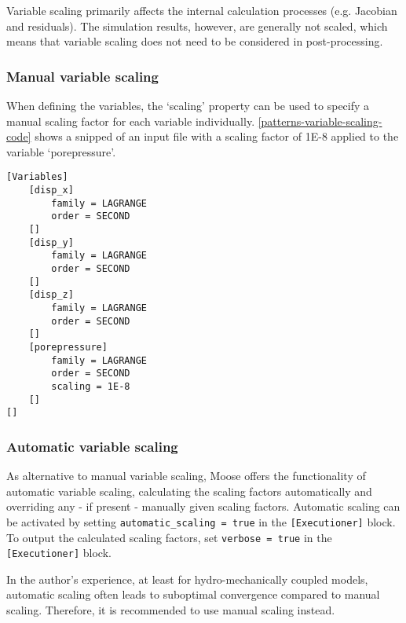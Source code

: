 Variable scaling primarily affects the internal calculation processes (e.g.
Jacobian and residuals). The simulation results, however, are generally not
scaled, which means that variable scaling does not need to be considered in
post-processing.

\subsubsection{Manual variable scaling}

When defining the variables, the ‘scaling’ property can be used to specify a
manual scaling factor for each variable individually.
\autoref{patterns-variable-scaling-code} shows a snipped of an input file with
a scaling factor of \qty{1E-8}{} applied to the variable ‘porepressure’.

\begin{lstlisting}[language=Moose, caption={Variable definition with scaling on porepressure in a Moose inut file},label={patterns-variable-scaling-code}]
[Variables]
    [disp_x]
        family = LAGRANGE
        order = SECOND
    []
    [disp_y]
        family = LAGRANGE
        order = SECOND
    []
    [disp_z]
        family = LAGRANGE
        order = SECOND
    []
    [porepressure]
        family = LAGRANGE
        order = SECOND
        scaling = 1E-8
    []
[]
\end{lstlisting}

\subsubsection{Automatic variable scaling}

As alternative to manual variable scaling, Moose offers the functionality of
automatic variable scaling, calculating the scaling factors automatically and
overriding any - if present - manually given scaling factors. Automatic scaling
can be activated by setting \texttt{automatic\_scaling = true} in the
\texttt{[Executioner]} block. To output the calculated scaling factors, set
\texttt{verbose = true} in the \texttt{[Executioner]} block.

In the author's experience, at least for hydro-mechanically coupled models,
automatic scaling often leads to suboptimal convergence compared to manual
scaling. Therefore, it is recommended to use manual scaling instead.



